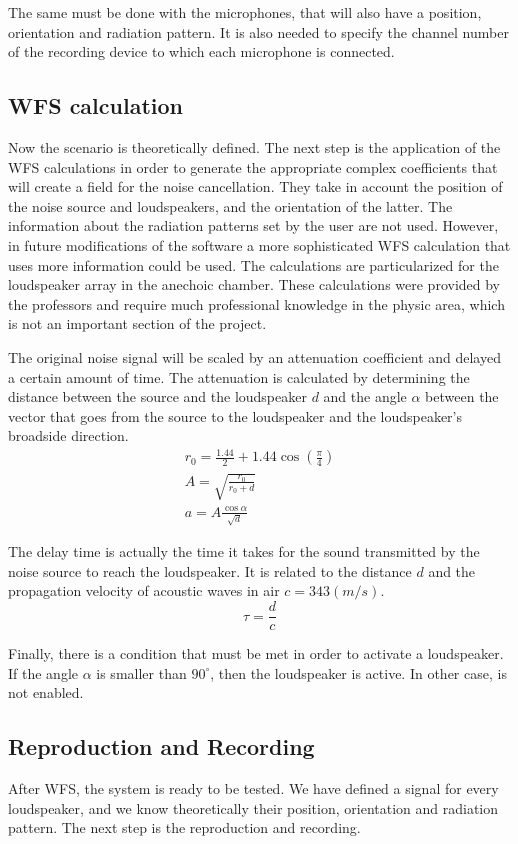 The same must be done with the microphones, that will also have a position, orientation and radiation pattern. It is also needed to specify the channel number of the recording device to which each microphone is connected.
 
\subsection{WFS calculation}
Now the scenario is theoretically defined. The next step is the application of the WFS calculations in order to generate the appropriate complex coefficients that will create a field for the noise cancellation. They take in account the position of the noise source and loudspeakers, and the orientation of the latter. The information about the radiation patterns set by the user are not used. However, in future modifications of the software a more sophisticated WFS calculation that uses more information could be used. The calculations are particularized for the loudspeaker array in the anechoic chamber. These calculations were provided by the professors and require much professional knowledge in the physic area, which is not an important section of the project.

The original noise signal will be scaled by an attenuation coefficient and delayed a certain amount of time. The attenuation is calculated by determining the distance between the source and the loudspeaker $d$ and the angle $\alpha$ between the vector that goes from the source to the loudspeaker and the loudspeaker's broadside direction.
\begin{align}
r_0 = \frac{1.44}{2} + 1.44 \cos\left( \frac{\pi}{4} \right)\\
A = \sqrt{\frac{r_0}{r_0 + d}}\\
a = A\frac{\cos\alpha}{\sqrt{d}}
\end{align}

The delay time is actually the time it takes for the sound transmitted by the noise source to reach the loudspeaker. It is related to the distance $d$ and the propagation velocity of acoustic waves in air $c = 343 (m/s)$.
\begin{equation}
\tau = \frac{d}{c}
\end{equation}

Finally, there is a condition that must be met in order to activate a loudspeaker. If the angle $\alpha$ is smaller than $90^\circ$, then the loudspeaker is active. In other case, is not enabled.

\subsection{Reproduction and Recording}
After WFS, the system is ready to be tested. We have defined a signal for every loudspeaker, and we know theoretically their position, orientation and radiation pattern. The next step is the reproduction and recording.

